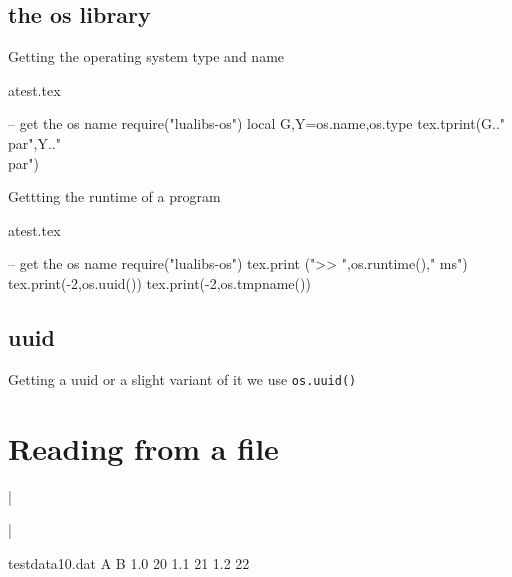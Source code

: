 \subsection{the os library}
Getting the operating system type and name
\begin{tcblisting}{}
\begin{filecontents}{atest.tex}
\end{filecontents}
\begin{luacode}
  -- get the os name
  require("lualibs-os")
  local G,Y=os.name,os.type
  tex.tprint({G.."\\par"},{Y.."\\par"})
\end{luacode}
\end{tcblisting}

Gettting the runtime of a program

\begin{texexample}{}{}
\begin{filecontents}{atest.tex}
\end{filecontents}
\begin{luacode}
  -- get the os name
  require("lualibs-os")
  tex.print (">> ",os.runtime()," ms")
  tex.print({-2,os.uuid()})
  tex.print({-2,os.tmpname()})
\end{luacode}
\end{texexample}



\subsection{uuid}
Getting a uuid or a slight variant of it we use \lstinline!os.uuid()!



\section{Reading from a file}

|\usepackage{luatextra}|


\begin{filecontents}{testdata10.dat}
  A  B
  1.0 20
  1.1 21
  1.2 22
\end{filecontents}
%
%
%

